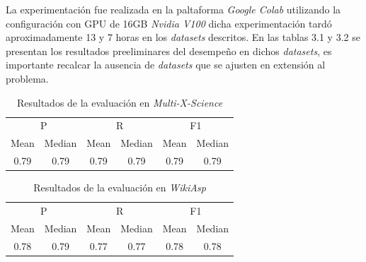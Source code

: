 La experimentación fue realizada en la paltaforma \emph{Google Colab} utilizando la configuración con GPU de 16GB \emph{Nvidia V100} dicha experimentación tardó aproximadamente 13 y 7 horas en los \emph{datasets} descritos. En las tablas 3.1 y 3.2 se presentan los resultados preeliminares del desempeño en dichos \emph{datasets}, es importante recalcar la ausencia de \emph{datasets} que se ajusten en extensión al problema.

\begin{table}[htb]
    \centering
    \label{tab:example}
    \begin{tabular}{*6c}
      \toprule
      \multicolumn{2}{c}{P}  & \multicolumn{2}{c}{R} & \multicolumn{2}{c}{F1} \\ \cmidrule(r){1-2} \cmidrule(r){3-4} \cmidrule(l){5-6}
      Mean & Median  &  Mean & Median &     Mean & Median   \\
      0.79 & 0.79  & 0.79 & 0.79 & 0.79 & 0.79                                                
      \bottomrule
    \end{tabular}
    \caption{Resultados de la evaluación en \emph{Multi-X-Science}}

  \end{table}

  \begin{table}[htb]
    \centering
    \label{tab:example}
    \begin{tabular}{*6c}
      \toprule
      \multicolumn{2}{c}{P}  & \multicolumn{2}{c}{R} & \multicolumn{2}{c}{F1} \\ \cmidrule(r){1-2} \cmidrule(r){3-4} \cmidrule(l){5-6}
      Mean & Median  &  Mean & Median &     Mean & Median   \\
      0.78 & 0.79  & 0.77 & 0.77 & 0.78 & 0.78 \\                                                
      \bottomrule
    \end{tabular}
    \caption{Resultados de la evaluación en \emph{WikiAsp}}

    
  \end{table}
